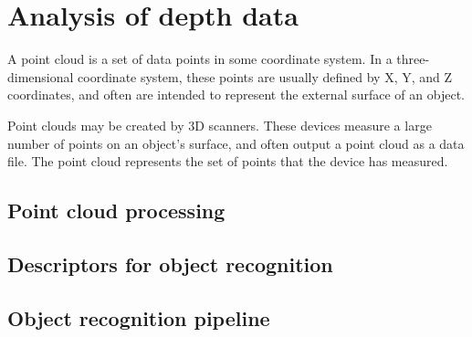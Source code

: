 \chapter{Analysis of depth data}
\label{cha:analysis}

A point cloud is a set of data points in some coordinate system. In a three-dimensional coordinate system, these points are usually defined by X, Y, and Z coordinates, and often are intended to represent the external surface of an object.

Point clouds may be created by 3D scanners. These devices measure a large number of points on an object's surface, and often output a point cloud as a data file. The point cloud represents the set of points that the device has measured.




\section{Point cloud processing}
\label{sec:pointclouds}



\section{Descriptors for object recognition}
\label{sec:descriptors}



\section{Object recognition pipeline}
\label{sec:pipeline}








